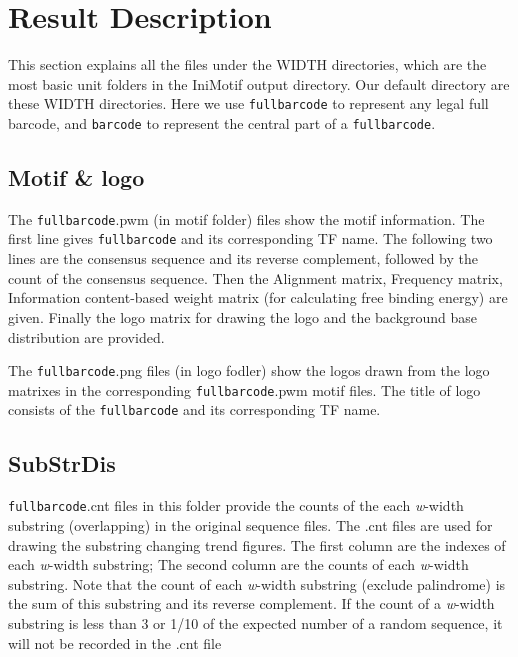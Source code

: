 \documentclass[a4paper,10pt]{article}
\begin{document}
\section{Result Description}
\label{sec:resultdescription}
This section explains all the files under the WIDTH directories, which are the most basic unit folders in the IniMotif output directory. 
Our default directory are these WIDTH directories. Here we use \texttt{fullbarcode} to represent any legal full barcode, and \texttt{barcode} to
 represent the central part of a \texttt{fullbarcode}.

\subsection{Motif \& logo}
The \texttt{fullbarcode}.pwm (in motif folder) files show the motif information.
The first line gives \texttt{fullbarcode} and its corresponding TF name.
The following two lines are the consensus sequence and its reverse complement, followed by the count of the consensus sequence.
Then the Alignment matrix, Frequency matrix, Information content-based weight matrix (for calculating free binding energy) are given.
Finally the logo matrix for drawing the logo and the background base distribution are provided.

The \texttt{fullbarcode}.png files (in logo fodler) show the logos drawn from the logo matrixes in the corresponding \texttt{fullbarcode}.pwm motif files.
The title of logo consists of the \texttt{fullbarcode} and its corresponding TF name. 

\subsection{SubStrDis}
\texttt{fullbarcode}.cnt files in this folder provide the counts of the each \textit{w}-width substring (overlapping) in the original sequence files.
The .cnt files are used for drawing the substring changing trend figures.
The first column are the indexes of each \textit{w}-width substring;
The second column are the counts of each \textit{w}-width substring.
Note that the count of each \textit{w}-width substring (exclude palindrome) is the sum of this substring and its reverse complement.
If the count of a \textit{w}-width substring is less than 3 or 1/10 of the expected number of a random sequence, it will not be recorded in the .cnt file
\end{document}
